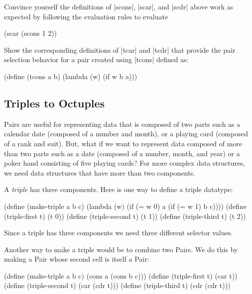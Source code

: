 \begin{schemeregion}
\beforeex
\begin{exercise}
Convince yourself the definitions of \scheme|scons|, \scheme|scar|, and \scheme|scdr| above work as expected by following the evaluation rules to evaluate 
\begin{schemedisplay}
(scar (scons 1 2))
\end{schemedisplay}
\solution{\LATER{}}
\end{exercise}
\afterex

\beforeex
\begin{exercise}
Show the corresponding definitions of \scheme|tcar| and \scheme|tcdr| that provide the pair selection behavior for a pair created using \scheme|tcons| defined as:
\begin{schemedisplay}
(define (tcons a b) (lambda (w) (if w b a)))
\end{schemedisplay}
\solution{\LATER{}}
\end{exercise}
\afterex


\subsection{Triples to Octuples}

Pairs are useful for representing data that is composed of two parts such as a calendar date (composed of a number and month), or a playing card (composed of a rank and suit).  But, what if we want to represent data composed of more than two parts such as a date (composed of a number, month, and year) or a poker hand consisting of five playing cards?   For more complex data structures, we need data structures that have more than two components.

A \emph{triple} has three components.  Here is one way to define a triple datatype:
\begin{schemedisplay}
(define (make-triple a b c) 
  (lambda (w) (if (= w 0) a (if (= w 1) b c))))                
(define (triple-first t)  (t 0))
(define (triple-second t) (t 1))
(define (triple-third t)  (t 2))
\end{schemedisplay}

Since a triple has three components we need three different selector values.  %

Another way to make a triple would be to combine two Pairs.  We do this by making a Pair whose second cell is itself a Pair:
\begin{schemedisplay}
(define (make-triple a b c) (cons a (cons b c)))
(define (triple-first t)  (car t))
(define (triple-second t) (car (cdr t)))
(define (triple-third t)  (cdr (cdr t)))
\end{schemedisplay}


\end{schemeregion}
